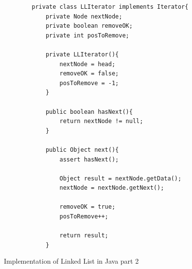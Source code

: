 \begin{figure}[H]
	\begin{lstlisting}
	    private class LLIterator implements Iterator{
	        private Node nextNode;
	        private boolean removeOK;
	        private int posToRemove;
	        
	        private LLIterator(){
	            nextNode = head;
	            removeOK = false;
	            posToRemove = -1;
	        }
	        
	        public boolean hasNext(){
	            return nextNode != null;
	        }
	        
	        public Object next(){
	            assert hasNext();
	            
	            Object result = nextNode.getData();
	            nextNode = nextNode.getNext();
	            
	            removeOK = true;
	            posToRemove++;
	            
	            return result;
	        }
	\end{lstlisting}
	\caption{Implementation of Linked List in Java part 2}
	\label{fig24}
\end{figure}
